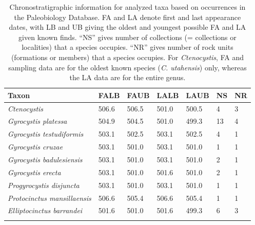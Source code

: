 \documentclass{article}
\begin{document}
\begin{table}[]
\caption{Chronostratigraphic information for analyzed taxa based on occurrences in the Paleobiology Database.  FA and LA denote first and last appearance dates, with LB and UB giving the oldest and youngest possible FA and LA given known finds. “NS” gives number of collections (= collections or localities) that a species occupies.  “NR” gives number of rock units (formations or members) that a species occupies.  For \textit{Ctenocystis}, FA and sampling data are for the oldest known species (\textit{C. utahensis}) only, whereas the LA data are for the entire genus.}
\begin{tabular}{l|llllll}
\rowcolor[HTML]{C0C0C0} 
Taxon                                                 & FALB  & FAUB  & LALB  & LAUB  & NS & NR \\ \hline
\textit{Ctenocystis}                 & 506.6 & 506.5 & 501.0 & 500.5 & 4  & 3  \\
\rowcolor[HTML]{C0C0C0} 
\textit{Gyrocystis platessa}         & 504.9 & 504.5 & 501.0 & 499.3 & 13 & 4  \\
\textit{Gyrocystis testudiformis}    & 503.1 & 502.5 & 503.1 & 502.5 & 4  & 1  \\
\rowcolor[HTML]{C0C0C0} 
\textit{Gyrocystis cruzae}           & 503.1 & 501.0 & 503.1 & 501.0 & 1  & 1  \\
\textit{Gyrocystis badulesiensis}    & 503.1 & 501.0 & 503.1 & 501.0 & 2  & 1  \\
\rowcolor[HTML]{C0C0C0} 

\textit{Gyrocystis erecta}           & 503.1 & 501.0 & 501.6 & 501.0 & 2  & 1  \\
\textit{Progyrocystis disjuncta}     & 503.1 & 501.0 & 503.1 & 501.0 & 1  & 1  \\
\rowcolor[HTML]{C0C0C0} 
\textit{Protocinctus mansillaensis}  & 506.6 & 505.4 & 506.6 & 505.4 & 1  & 1  \\
\textit{Elliptocinctus barrandei}    & 501.6 & 501.0 & 501.6 & 499.3 & 6  & 3  \\
\rowcolor[HTML]{C0C0C0} 


\end{tabular}
\end{table}
\end{document}
